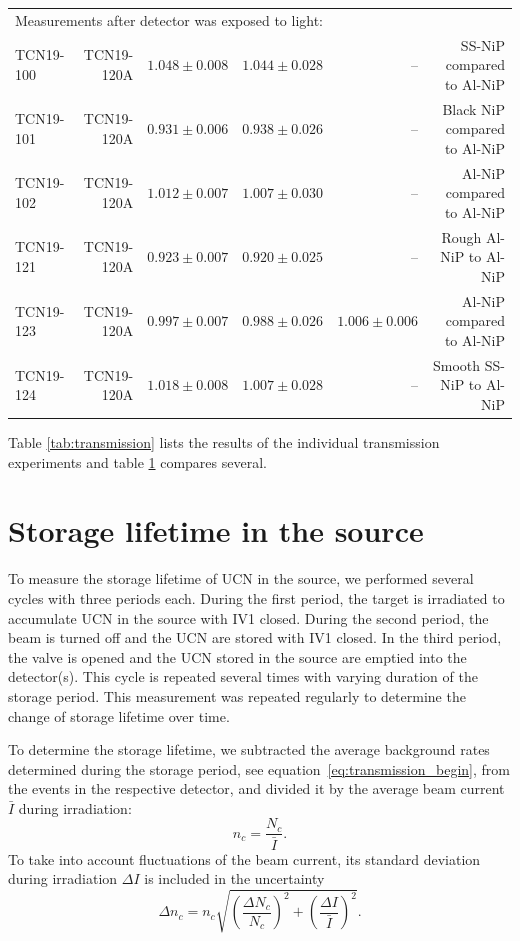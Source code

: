 \documentclass[10pt,letterpaper]{article}
\begin{document}
\begin{table}
\begin{tabular}{l r r r r r}
\midrule
\multicolumn{5}{l}{Measurements after detector was exposed to light:} \\ 
TCN19-100 & TCN19-120A & $1.048 \pm 0.008$ & $1.044 \pm 0.028$ & -- & SS-NiP compared to Al-NiP \\
TCN19-101 & TCN19-120A & $0.931 \pm 0.006$ & $0.938 \pm 0.026$ & -- & Black NiP compared to Al-NiP \\
TCN19-102 & TCN19-120A & $1.012 \pm 0.007$ & $1.007 \pm 0.030$ & -- & Al-NiP compared to Al-NiP \\
TCN19-121 & TCN19-120A & $0.923 \pm 0.007$ & $0.920 \pm 0.025$ & -- & Rough Al-NiP to Al-NiP \\
TCN19-123 & TCN19-120A & $0.997 \pm 0.007$ & $0.988 \pm 0.026$ & $1.006 \pm 0.006$ & Al-NiP compared to Al-NiP \\
TCN19-124 & TCN19-120A & $1.018 \pm 0.008$ & $1.007 \pm 0.028$ & -- & Smooth SS-NiP to Al-NiP \\
\bottomrule
\end{tabular}
\label{tab:transmission_comparison}
\end{table}

Table \ref{tab:transmission} lists the results of the individual transmission experiments and table \ref{tab:transmission_comparison} compares several.



\section{Storage lifetime in the source}
\label{sec:storagelifetime}

To measure the storage lifetime of UCN in the source, we performed several cycles with three periods each. During the first period, the target is irradiated to accumulate UCN in the source with IV1 closed. During the second period, the beam is turned off and the UCN are stored with IV1 closed. In the third period, the valve is opened and the UCN stored in the source are emptied into the detector(s). This cycle is repeated several times with varying duration of the storage period. This measurement was repeated regularly to determine the change of storage lifetime over time.

To determine the storage lifetime, we subtracted the average background rates determined during the storage period, see equation~\ref{eq:transmission_begin}, from the events in the respective detector, and divided it by the average beam current $\bar{I}$ during irradiation:
\begin{equation}
n_c = \frac{N_c}{\bar{I}}.
\end{equation}
To take into account fluctuations of the beam current, its standard deviation during irradiation $\Delta I$ is included in the uncertainty
\begin{equation}
\Delta n_c = n_c \sqrt{ \left( \frac{\Delta N_c}{N_c} \right)^2 + \left( \frac{\Delta I}{\bar{I}} \right)^2 }.
\end{equation}
\end{document}
